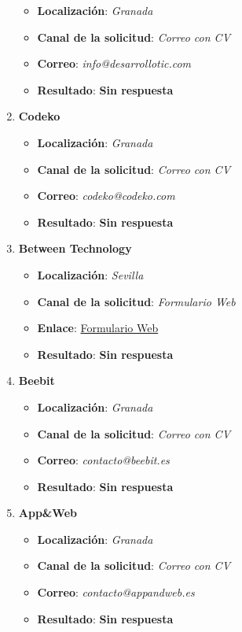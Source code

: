 \begin{enumerate}
\begin{itemize}
		\item \textbf{Localización}: \textit{Granada}
		\item \textbf{Canal de la solicitud}: \textit{Correo con CV}
		\item \textbf{Correo}: \textit{info@desarrollotic.com}
		\item \textbf{Resultado}: {\color{orange} \textbf{Sin respuesta}}
	\end{itemize}
	\item \textbf{Codeko}
	\begin{itemize}
		\item \textbf{Localización}: \textit{Granada}
		\item \textbf{Canal de la solicitud}: \textit{Correo con CV}
		\item \textbf{Correo}: \textit{codeko@codeko.com}
		\item \textbf{Resultado}: {\color{orange} \textbf{Sin respuesta}}
	\end{itemize}
	\item \textbf{Between Technology}
	\begin{itemize}
		\item \textbf{Localización}: \textit{Sevilla}
		\item \textbf{Canal de la solicitud}: \textit{Formulario Web}
		\item \textbf{Enlace}: \href{https://between.talentclue.com/es/node/add/cv/job/5810780/company/94766327/12623479?clicked_button=apply_manually}{Formulario Web}
		\item \textbf{Resultado}: {\color{orange} \textbf{Sin respuesta}}
	\end{itemize}
	\item \textbf{Beebit}
	\begin{itemize}
		\item \textbf{Localización}: \textit{Granada}
		\item \textbf{Canal de la solicitud}: \textit{Correo con CV}
		\item \textbf{Correo}: \textit{contacto@beebit.es}
		\item \textbf{Resultado}: {\color{orange} \textbf{Sin respuesta}}
	\end{itemize}
		\item \textbf{App\&Web}
	\begin{itemize}
		\item \textbf{Localización}: \textit{Granada}
		\item \textbf{Canal de la solicitud}: \textit{Correo con CV}
		\item \textbf{Correo}: \textit{contacto@appandweb.es}
		\item \textbf{Resultado}: {\color{orange} \textbf{Sin respuesta}}
	\end{itemize}
\end{enumerate}







%

